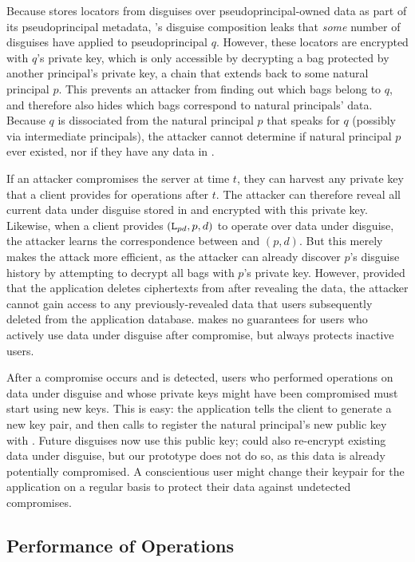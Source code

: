 %
Because \sys stores locators from disguises over pseudoprincipal-owned data as part
of its pseudoprincipal metadata, \sys's disguise composition leaks that \emph{some}
number of disguises have applied to pseudoprincipal $q$.
%
However, these locators are encrypted with $q$'s private key, which is only accessible
by decrypting a bag protected by another principal's private key, a chain that extends
back to some natural principal $p$.
%
This prevents an attacker from finding out which bags belong to $q$, and therefore
also hides which bags correspond to natural principals' data.
%
Because $q$ is dissociated from the natural principal $p$ that speaks for $q$
(possibly via intermediate principals), the attacker cannot determine if natural
principal $p$ ever existed, nor if they have any data in \sys.
%

%
If an attacker compromises the server at time $t$, they can harvest any private key
that a client provides for operations after $t$.
%
The attacker can therefore reveal all current data under disguise stored in \sys and
encrypted with this private key.
%
Likewise, when a client provides $(\texttt{L}_{pd}, p, d)$ to operate over data under disguise,
the attacker learns the correspondence between  and $(p, d)$.
%
But this merely makes the attack more efficient, as the attacker can already discover
$p$'s disguise history by attempting to decrypt all bags with $p$'s private key.
%
However, provided that the application deletes ciphertexts from \sys after revealing
the data, the attacker cannot gain access to any previously-revealed data that users
subsequently deleted from the application database.
%
\sys makes no guarantees for users who actively use data under disguise after
compromise, but always protects inactive users.
%

%
After a compromise occurs and is detected, users who performed operations on data
under disguise and whose private keys might have been compromised must start using new
keys.
%
This is easy: the application tells the client to generate a new key pair, and then
calls  to register the natural principal's new public key with
\sys.
%
Future disguises now use this public key; \sys could also re-encrypt existing data
under disguise, but our prototype does not do so, as this data is already potentially
compromised.
%
A conscientious user might change their keypair for the application on a regular basis
to protect their data against undetected compromises.
%

\subsection{Performance of \sys Operations}
\label{s:eval-ops}

